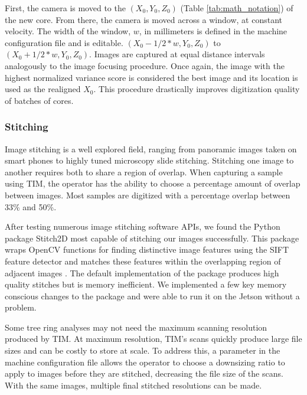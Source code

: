 \documentclass[a4paper,12pt]{article}
\begin{document}
First, the camera is moved to the $(X_0, Y_0, Z_0)$ (Table \ref{tab:math_notation}) of the new core. 
From there, the camera is moved across a window, at constant velocity. %
The width of the window, $w$, in millimeters is defined in the machine configuration file and is editable. %
$(X_0 - 1/2*{w}, Y_0, Z_0)$ to $(X_0 + 1/2*{w}, Y_0, Z_0)$. 
Images are captured at equal distance intervals analogously to the image focusing procedure. 
Once again, the image with the highest normalized variance score is considered the best image and its location is used as the realigned $X_0$.
This procedure drastically improves digitization quality of batches of cores.

\subsubsection{Stitching}

Image stitching is a well explored field, ranging from panoramic images taken on smart phones to highly tuned microscopy slide stitching. 
Stitching one image to another requires both to share a region of overlap. When capturing a sample using TIM, the operator has the ability to choose a percentage amount of overlap between images.
Most samples are digitized with a percentage overlap between 33\% and 50\%.

After testing numerous image stitching software APIs, we found the Python package Stitch2D most capable of stitching our images successfully. %
This package wraps OpenCV functions for finding distinctive image features using the SIFT feature detector and matches these features within the overlapping region of adjacent images \citep{lowe_distinctive_2004}. 
The default implementation of the package produces high quality stitches but is memory inefficient. %
We implemented a few key memory conscious changes to the package and were able to run it on the Jetson without a problem. 

Some tree ring analyses may not need the maximum scanning resolution produced by TIM. At maximum resolution, TIM's scans quickly produce large file sizes and can be costly to store at scale. 
To address this, a parameter in the machine configuration file allows the operator to choose a downsizing ratio to apply to images before they are stitched, decreasing the file size of the scans.
With the same images, multiple final stitched resolutions can be made. 
\end{document}
